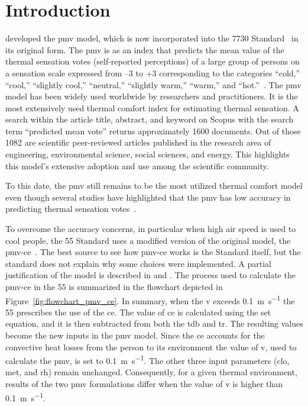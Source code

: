 \section{Introduction}\label{sec:introduction}
 developed the \ac{pmv} model, which is now incorporated into the \gls{7730} Standard~\cite{iso7730} in its original form.
The \ac{pmv} is as an index that predicts the mean value of the thermal sensation votes (self-reported perceptions) of a large group of persons on a sensation scale expressed from –3 to +3 corresponding to the categories ``cold,'' ``cool,'' ``slightly cool,'' ``neutral,'' ``slightly warm,'' ``warm,'' and ``hot.''~\cite{iso7730, ashrae552023}.
The \ac{pmv} model has been widely used worldwide by researchers and practitioners.
It is the most extensively used thermal comfort index for estimating thermal sensation.
A search within the article title, abstract, and keyword on Scopus with the search term ``predicted mean vote'' returns approximately \num{1600} documents.
Out of those \num{1082} are scientific peer-reviewed articles published in the research area of engineering, environmental science, social sciences, and energy.
This highlights this model's extensive adoption and use among the scientific community.

To this date, the \ac{pmv} still remains to be the most utilized thermal comfort model even though several studies have highlighted that the \ac{pmv} has low accuracy in predicting thermal sensation votes~\cite{Cheung2019, Yao2022, kim2019thermal, tartarini2018thermal, Humphreys2002, doherty_evaluation_1988}.

To overcome the accuracy concerns, in particular when high air speed is used to cool people, the \gls{55} Standard uses a modified version of the original model, the \ac{pmv-ce}~\cite{ashrae552023}.
The best source to see how \ac{pmv-ce} works is the Standard itself, but the standard does not explain why some choices were implemented.
A partial justification of the model is described in  and .
The process used to calculate the \ac{pmv-ce} in the \gls{55} is summarized in the flowchart depicted in Figure~\ref{fig:flowchart_pmv_ce}.
In summary, when the \ac{v} exceeds \qty{0.1}{\m\per\s} the \gls{55} prescribes the use of the \ac{ce}.
The value of \ac{ce} is calculated using the \ac{set} equation, and it is then subtracted from both the \ac{tdb} and \ac{tr}.
The resulting values become the new inputs in the \ac{pmv} model.
Since the \ac{ce} accounts for the convective heat losses from the person to its environment the value of \ac{v}, used to calculate the \ac{pmv}, is set to \qty{0.1}{\m\per\s}.
The other three input parameters (\ac{clo}, \ac{met}, and \ac{rh}) remain unchanged.
Consequently, for a given thermal environment, results of the two \ac{pmv} formulations differ when the value of \ac{v} is higher than \qty{0.1}{\m\per\s}.

